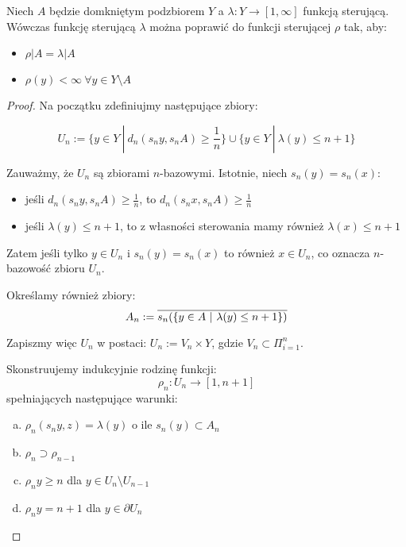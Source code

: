 \begin{thm}
Niech $A$ będzie domkniętym podzbiorem $Y$ a $\lambda: Y \rightarrow [1,\infty]$ funkcją sterującą. Wówczas funkcję sterującą $\lambda$ można poprawić do funkcji sterującej $\rho$ tak, aby:
\begin{itemize}
  \item $\rho|A = \lambda|A$
  \item $\rho(y) < \infty\ \forall y \in Y \setminus A$
\end{itemize}

\begin{proof}
  
  Na początku zdefiniujmy następujące zbiory:
  
  $$U_n := \{y \in Y\ |\ d_n(s_n y, s_n A) \geq \frac{1}{n}\} \cup \{y \in Y\ |\ \lambda(y) \leq n+1\}$$
  
  Zauważmy, że $U_n$ są zbiorami $n$-bazowymi. Istotnie, niech $s_n(y) = s_n(x)$:
  \begin{itemize}
    \item jeśli $d_n(s_n y, s_n A) \geq \frac{1}{n}$, to $d_n(s_n x, s_n A) \geq \frac{1}{n}$
    \item jeśli $\lambda(y) \leq n+1$, to z własności sterowania mamy również $\lambda(x) \leq n+1$
  \end{itemize}
  Zatem jeśli tylko $y \in U_n$ i $s_n(y) = s_n(x)$ to również $x \in U_n$, co oznacza $n$-bazowość zbioru $U_n$.
  
  Określamy również zbiory:
  $$A_n := \overline{s_n({\{y \in A\ |\ \lambda(y) \leq n+1\}})}$$
  
  
  
  Zapiszmy więc $U_n$ w postaci: $U_n := V_n \times Y$, gdzie $V_n \subset \Pi_{i=1}^n$.
  
  Skonstruujemy indukcyjnie rodzinę funkcji:
  $$\rho_n: U_n \rightarrow [1, n+1]$$
  spełniających następujące warunki:
  \begin{enumerate}[(a)]
    \item \label{induction-1} $\rho_n(s_n y, z) = \lambda(y)$ o ile $s_n(y) \subset A_n$
    \item \label{induction-2} $\rho_n \supset \rho_{n-1}$
    \item \label{induction-3} $\rho_n y \geq n$ dla $y \in U_n \setminus U_{n-1}$
    \item \label{induction-4} $\rho_n y = n+1$ dla $y \in \partial U_n$
  \end{enumerate}
  

\end{proof}
\end{thm}

